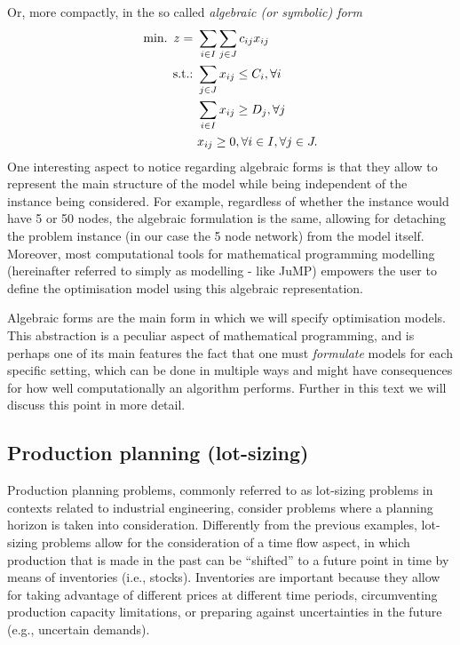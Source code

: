 Or, more compactly, in the so called \emph{algebraic (or symbolic) form}
%
\begin{align*}
	\mathop{\text{min.~}} z = \ &\sum_{i \in I}\sum_{j \in J}c_{ij}x_{ij}\\
	\mathop{\text{s.t.:~}} & \sum_{j \in J} x_{ij} \leq C_i, \forall i\\
	& \sum_{i \in I} x_{ij} \geq D_j, \forall j\\
	&x_{ij} \geq 0, \forall i \in I, \forall j \in J.
\end{align*}
%
One interesting aspect to notice regarding algebraic forms is that they allow to represent the main structure of the model while being independent of the instance being considered. For example, regardless of whether the instance would have 5 or 50 nodes, the algebraic formulation is the same, allowing for detaching the problem instance (in our case the 5 node network) from the model itself. Moreover, most computational tools for mathematical programming modelling (hereinafter referred to simply as modelling - like JuMP) empowers the user to define the optimisation model using this algebraic representation.

Algebraic forms are the main form in which we will specify optimisation models. This abstraction is a peculiar aspect of mathematical programming, and is perhaps one of its main features the fact that one must \emph{formulate} models for each specific setting, which can be done in multiple ways and might have consequences for how well computationally an algorithm performs. Further in this text we will discuss this point in more detail.  


\subsection{Production planning (lot-sizing)}


Production planning problems, commonly referred to as lot-sizing problems in contexts related to industrial engineering, consider problems where a planning horizon is taken into consideration. Differently from the previous examples, lot-sizing problems allow for the consideration of a time flow aspect, in which production that is made in the past can be ``shifted'' to a future point in time by means of inventories (i.e., stocks). Inventories are important because they allow for taking advantage of different prices at different time periods, circumventing production capacity limitations, or preparing against uncertainties in the future (e.g., uncertain demands).

